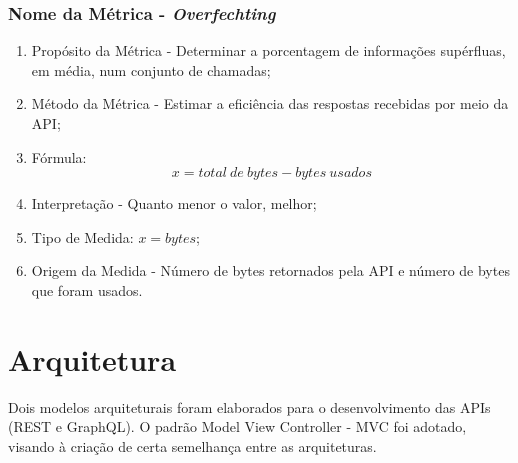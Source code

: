 \documentclass[conference]{IEEEtran}
\begin{document}
\begin{enumerate}
\subsubsection{Nome da Métrica - \textit{Overfechting}}\label{CC}
\begin{enumerate}
\item Propósito da Métrica - Determinar a porcentagem de informações supérfluas, em média, num conjunto de chamadas;
\item Método da Métrica - Estimar a eficiência das respostas recebidas por meio da API;
\item Fórmula:
\begin{equation}
x = total\ de\ bytes - bytes\ usados\label{eq:over}
\end{equation}
\item Interpretação - Quanto menor o valor, melhor;
\item Tipo de Medida: $x = bytes$;
\item Origem da Medida - Número de bytes retornados pela API e número de bytes que foram usados.
\end{enumerate}
\end{enumerate}

\section{Arquitetura}
\label{sec:arquitetura}

Dois modelos arquiteturais foram elaborados para o desenvolvimento das APIs (REST e GraphQL). O padrão Model View Controller - MVC foi adotado, visando à criação de certa semelhança entre as arquiteturas.
\end{document}
